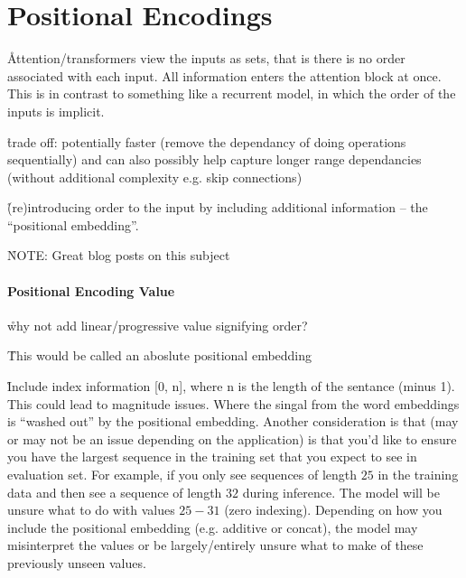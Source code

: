 \chapter{Positional Encodings}



\r{Attention/transformers view the inputs as sets, that is there is no order associated with each input. All information enters the attention block at once. This is in contrast to something like a recurrent model, in which the order of the inputs is implicit.}

\r{trade off: potentially faster (remove the dependancy of doing operations sequentially) and can also possibly help capture longer range dependancies (without additional complexity e.g. skip connections)}

\r{(re)introducing order to the input by including additional information -- the ``positional embedding''.}

\r{NOTE: Great blog posts on this subject~\cite{kazemnejad_2021, kernes_2021, kernes_2021B}}

\subsubsection{Positional Encoding Value}

\r{why not add linear/progressive value signifying order?}

\r{This would be called an aboslute positional embedding}

\r{Include index information [0, n], where n is the length of the sentance (minus 1). This could lead to magnitude issues. Where the singal from the word embeddings is ``washed out'' by the positional embedding.  Another consideration is that (may or may not be an issue depending on the application) is that you'd like to ensure you have the largest sequence in the training set that you expect to see in evaluation set. For example, if you only see sequences of length $25$ in the training data and then see a sequence of length $32$ during inference. The model will be unsure what to do with values $25 - 31$ (zero indexing). Depending on how you include the positional embedding (e.g. additive or concat), the model may misinterpret the values or be largely/entirely unsure what to make of these previously unseen values.}


